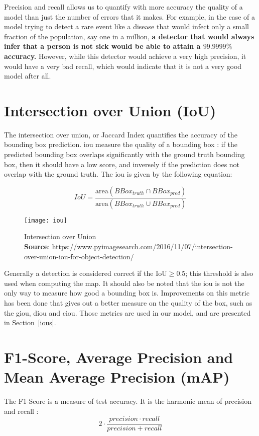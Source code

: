 Precision and recall allows us to quantify with more accuracy the quality of a model than just the number of errors that it makes. For example, in the case of a model trying to detect a rare event like a disease that would infect only a small fraction of the population, say one in a million, \textbf{a detector that would always infer that a person is not sick would be able to attain a $99.9999\%$ accuracy.} However, while this detector would achieve a very high precision, it would have a very bad recall, which would indicate that it is not a very good model after all.

\section{Intersection over Union (IoU)}\label{iouExplanation}
The intersection over union, or Jaccard Index quantifies the accuracy of the bounding box prediction. \gls{iou} measure the quality of a bounding box : if the predicted bounding box overlaps significantly with the ground truth bounding box, then it should have a low score, and inversely if the prediction does not overlap with the ground truth. The \gls{iou} is given by the following equation:

\begin{equation}
	IoU = \frac{\text{area}(BBox_{truth} \cap BBox_{pred})} {\text{area}(BBox_{truth} \cup BBox_{pred})}
\end{equation}

\begin{figure}
  \centering
  \texttt{[image: iou]}
	\caption[Intersection over Union]{Intersection over Union\\\textbf{Source}: https://www.pyimagesearch.com/2016/11/07/intersection-over-union-iou-for-object-detection/}
  \label{fig:iou}
\end{figure}

Generally a detection is considered correct if the $\text{IoU} \geq 0.5$; this threshold is also used when computing the \gls{map}. It should also be noted that the \gls{iou} is not the only way to measure how good a bounding box is. Improvements on this metric has been done that gives out a better measure on the quality of the box, such as the \gls{giou}\cite{giou}, \gls{diou}\cite{diou} and \gls{ciou}\cite{diou}. Those metrics are used in our model, and are presented in Section~\ref{ious}. 

\section{F1-Score, Average Precision and Mean Average Precision (mAP)}
The F1-Score is a measure of test accuracy. It is the harmonic mean of precision and recall :
\begin{equation}
	2 \cdot \frac{precision \cdot recall}{precision + recall}
\end{equation}

